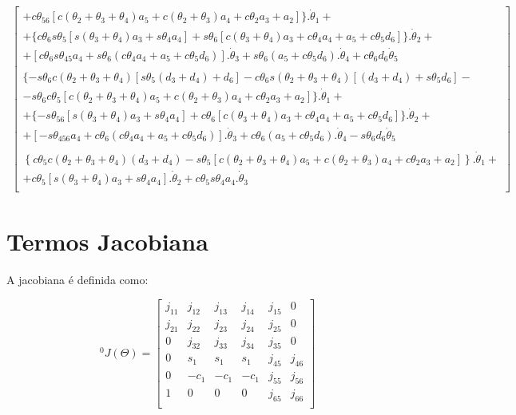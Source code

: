 \begin{equation}
\begin{gathered}
\begin{bmatrix}
        +c\theta_{56}[c(\theta_2 + \theta_3 + \theta_4)a_5 + c(\theta_2 + \theta_3)a_4 + c\theta_2a_3 + a_2]\}.\dot{\theta}_1 + \\
        +\{c\theta_6s\theta_5[s(\theta_3+\theta_4)a_3 + s\theta_4a_4] + s\theta_6[c(\theta_3+\theta_4)a_3 + c\theta_4a_4 + a_5 + c\theta_5d_6]\}.\dot{\theta}_2 + \\
        +[c\theta_6s\theta_{45}a_4 + s\theta_6(c\theta_4a_4 + a_5 + c\theta_5d_6)].\dot{\theta}_3 + s\theta_6(a_5 + c\theta_5d_6).\dot{\theta}_4 + c\theta_6d_6\dot{\theta}_5 \\ 
        \\
        \{-s\theta_6c(\theta_2 + \theta_3 + \theta_4)[s\theta_5(d_3+d_4) + d_6] - c\theta_6s(\theta_2 + \theta_3 + \theta_4)[(d_3+d_4) + s\theta_5d_6] - \\
        -s\theta_6c\theta_5[c(\theta_2 + \theta_3 + \theta_4)a_5 + c(\theta_2 + \theta_3)a_4 + c\theta_2a_3 + a_2]\}.\dot{\theta}_1 + \\
        +\{-s\theta_{56}[s(\theta_3+\theta_4)a_3 + s\theta_4a_4] + c\theta_6[c(\theta_3+\theta_4)a_3 + c\theta_4a_4 + a_5 + c\theta_5d_6]\}.\dot{\theta}_2 + \\
        +[-s\theta_{456}a_4 + c\theta_6(c\theta_4a_4 + a_5 + c\theta_5d_6)].\dot{\theta}_3 + c\theta_6(a_5 + c\theta_5d_6).\dot{\theta}_4 - s\theta_6d_6\dot{\theta}_5 \\ 
        \\
        \left\{c\theta_5c(\theta_2 + \theta_3 + \theta_4)(d_3+d_4) - s\theta_5[c(\theta_2 + \theta_3 + \theta_4)a_5 + c(\theta_2 + \theta_3)a_4 + c\theta_2a_3 + a_2]\right\}.\dot{\theta}_1 + \\
        + c\theta_5[s(\theta_3+\theta_4)a_3 + s\theta_4a_4].\dot{\theta}_2 + c\theta_5s\theta_4a_4.\dot{\theta}_3 \\ 
    \end{bmatrix}
\end{gathered}
\end{equation}

\section{Termos Jacobiana}
\label{AnexoJacobiana-SecTermos}

A jacobiana é definida como:

\begin{equation}
    ^0J(\Theta) = 
    \begin{bmatrix}
        j_{11} & j_{12} & j_{13} & j_{14} & j_{15} & 0 \\
        j_{21} & j_{22} & j_{23} & j_{24} & j_{25} & 0 \\
        0 & j_{32} & j_{33} & j_{34} & j_{35} & 0 \\
        0 &  s_1 &  s_1 &  s_1 & j_{45} & j_{46} \\
        0 & -c_1 & -c_1 & -c_1 & j_{55} & j_{56} \\
        1 &   0  &   0  &   0  & j_{65} & j_{66} \\    
    \end{bmatrix}
\end{equation}

